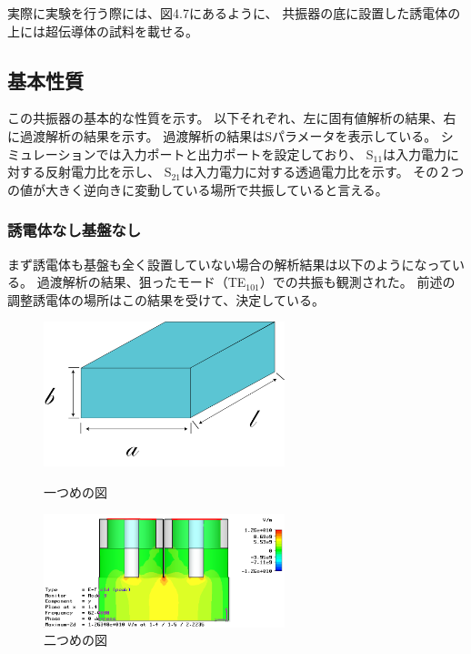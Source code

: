 実際に実験を行う際には、図4.7にあるように、
共振器の底に設置した誘電体の上には超伝導体の試料を載せる。

\subsection{基本性質}
この共振器の基本的な性質を示す。
以下それぞれ、左に固有値解析の結果、右に過渡解析の結果を示す。
過渡解析の結果はSパラメータを表示している。
シミュレーションでは入力ポートと出力ポートを設定しており、
S$_{11}$は入力電力に対する反射電力比を示し、
S$_{21}$は入力電力に対する透過電力比を示す。
その２つの値が大きく逆向きに変動している場所で共振していると言える。


\subsubsection{誘電体なし基盤なし}
まず誘電体も基盤も全く設置していない場合の解析結果は以下のようになっている。
過渡解析の結果、狙ったモード（TE$_{101}$）での共振も観測された。
前述の調整誘電体の場所はこの結果を受けて、決定している。

\begin{figure}[h]
 \begin{minipage}{0.5\hsize}
  \begin{center}
   \includegraphics[width=70mm]{./image/空洞共振器.png}
  \end{center}
  \caption{一つめの図}
  \label{fig:one}
 \end{minipage}
 \begin{minipage}{0.5\hsize}
  \begin{center}
   \includegraphics[width=70mm]{./image/model73_vac.png}
  \end{center}
  \caption{二つめの図}
  \label{fig:two}
 \end{minipage}
\end{figure}

